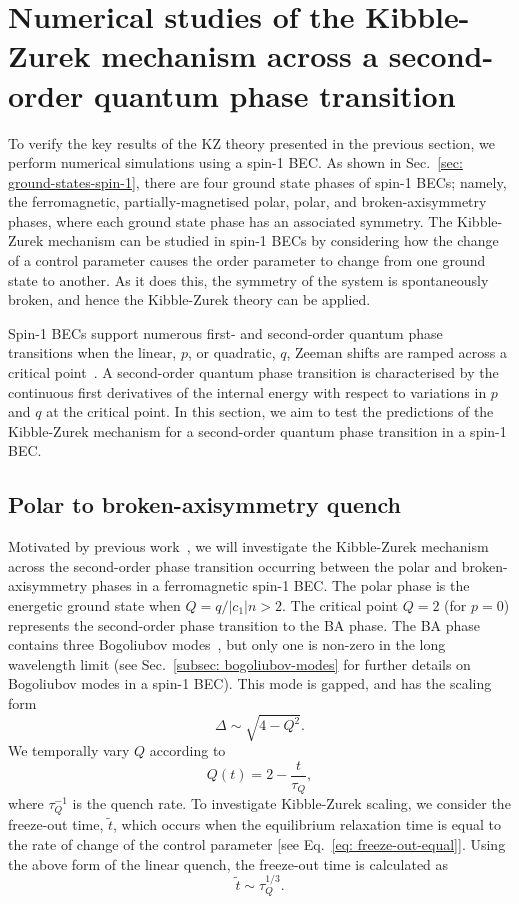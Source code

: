 \section{Numerical studies of the Kibble-Zurek mechanism across a second-order
quantum phase transition}
To verify the key results of the KZ theory presented in the previous section,
we perform numerical simulations using a spin-1 BEC\@.
As shown in Sec.~\ref{sec: ground-states-spin-1}, there are four ground state
phases of spin-1 BECs; namely, the ferromagnetic, partially-magnetised polar,
polar, and broken-axisymmetry phases, where each ground state phase has an
associated symmetry.
The Kibble-Zurek mechanism can be studied in spin-1 BECs by considering how
the change of a control parameter causes the order parameter to change from
one ground state to another.
As it does this, the symmetry of the system is spontaneously broken, and hence
the Kibble-Zurek theory can be applied.

Spin-1 BECs support numerous first- and second-order quantum phase transitions
when the linear, \( p \), or quadratic, \( q \), Zeeman shifts are
ramped across a critical point~\cite{Kawaguchi2012}.
A second-order quantum phase transition is characterised by the continuous first
derivatives of the internal energy with respect to variations in \( p \) and
\( q \) at the critical point.
In this section, we aim to test the predictions of the Kibble-Zurek mechanism
for a second-order quantum phase transition in a spin-1 BEC\@.

\subsection{\label{sec: KZM-second-order-numerics}Polar to broken-axisymmetry
quench}
Motivated by previous work~\cite{Damski2007}, we will investigate the
Kibble-Zurek mechanism across the second-order phase transition occurring
between the polar and broken-axisymmetry phases in a ferromagnetic spin-1 BEC\@.
The polar phase is the energetic ground state when \( Q=q/|c_1|n > 2 \).
The critical point \( Q = 2 \) (for \(p=0\)) represents the second-order phase
transition to the BA phase.
The BA phase contains three Bogoliubov modes~\cite{Uchino2010}, but only one
is non-zero in the long wavelength limit (see
Sec.~\ref{subsec: bogoliubov-modes} for further details on Bogoliubov modes in
a spin-1 BEC).
This mode is gapped, and has the scaling form
\begin{equation}
    \Delta \sim \sqrt{4 - Q^2}.
\end{equation}
We temporally vary \(Q\) according to
\begin{equation}
    Q(t) = 2 - \frac{t}{\tau_Q},
    \label{eq: time-dep-Q-damski}
\end{equation}
where \( \tau_Q^{-1} \) is the quench rate.
To investigate Kibble-Zurek scaling, we consider the freeze-out time,
\( \tilde{t} \), which occurs when the equilibrium relaxation time is equal to
the rate of change of the control parameter [see
Eq.~\eqref{eq: freeze-out-equal}].
Using the above form of the linear quench, the freeze-out time is calculated
as~\cite{Damski2007}
\begin{equation}
    \tilde{t} \sim \tau_Q^{1/3}.
\end{equation}

